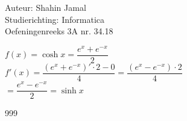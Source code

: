 \documentclass[a4paper]{article}
\begin{document}
  
\noindent \large Auteur: Shahin Jamal \\
\noindent \large Studierichting: Informatica\\
\noindent \large Oefeningenreeks 3A nr. 34.18\\

\medskip

\normalsize

$f(x) = \cosh x = \dfrac{e^x + e^{-x}}{2}$\\

$f'(x) = \dfrac{(e^x + e^{-x})' \cdot 2 - 0}{4} = \dfrac{(e^x - e^{-x}) \cdot 2}{4}$\\

$= \dfrac{e^x - e^{-x}}{2} = \sinh x$\\

\begin{thebibliography}{999}
\end{thebibliography}
\end{document}
